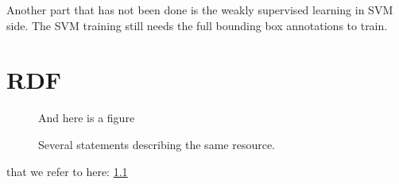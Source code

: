 \documentclass[a4paper,11pt]{kth-mag}
\begin{document}
Another part that has not been done is the weakly supervised learning in SVM side. The SVM training still needs the full bounding box annotations to train.




\appendix
\addappheadtotoc
\chapter{RDF}\label{appA}

\begin{figure}[ht]
\begin{center}
And here is a figure
\caption{\small{Several statements describing the same resource.}}\label{RDF_4}
\end{center}
\end{figure}

that we refer to here: \ref{RDF_4}
\end{document}
